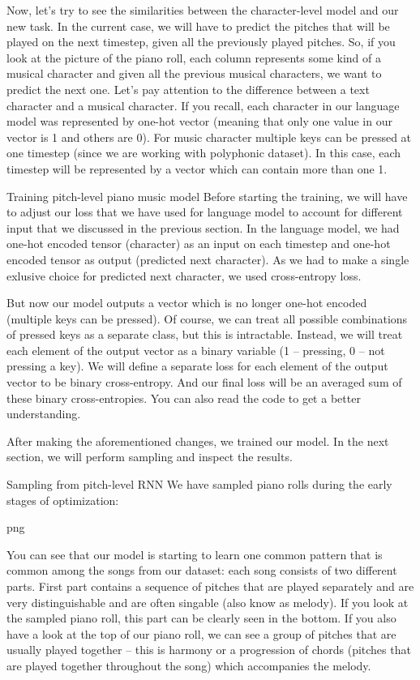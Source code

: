 \documentclass{article}
\begin{document}
Now, let’s try to see the similarities between the character-level model and our new task. In the current case, we will have to predict the pitches that will be played on the next timestep, given all the previously played pitches. So, if you look at the picture of the piano roll, each column represents some kind of a musical character and given all the previous musical characters, we want to predict the next one. Let’s pay attention to the difference between a text character and a musical character. If you recall, each character in our language model was represented by one-hot vector (meaning that only one value in our vector is 1 and others are 0). For music character multiple keys can be pressed at one timestep (since we are working with polyphonic dataset). In this case, each timestep will be represented by a vector which can contain more than one 1.

Training pitch-level piano music model
Before starting the training, we will have to adjust our loss that we have used for language model to account for different input that we discussed in the previous section. In the language model, we had one-hot encoded tensor (character) as an input on each timestep and one-hot encoded tensor as output (predicted next character). As we had to make a single exlusive choice for predicted next character, we used cross-entropy loss.\cite{DBLP:journals/jr/JiaWXKS17}

But now our model outputs a vector which is no longer one-hot encoded (multiple keys can be pressed). Of course, we can treat all possible combinations of pressed keys as a separate class, but this is intractable. Instead, we will treat each element of the output vector as a binary variable (1 – pressing, 0 – not pressing a key). We will define a separate loss for each element of the output vector to be binary cross-entropy. And our final loss will be an averaged sum of these binary cross-entropies. You can also read the code to get a better understanding.

After making the aforementioned changes, we trained our model. In the next section, we will perform sampling and inspect the results.

Sampling from pitch-level RNN
We have sampled piano rolls during the early stages of optimization:

png

You can see that our model is starting to learn one common pattern that is common among the songs from our dataset: each song consists of two different parts. First part contains a sequence of pitches that are played separately and are very distinguishable and are often singable (also know as melody). If you look at the sampled piano roll, this part can be clearly seen in the bottom. If you also have a look at the top of our piano roll, we can see a group of pitches that are usually played together – this is harmony or a progression of chords (pitches that are played together throughout the song) which accompanies the melody.
\end{document}
